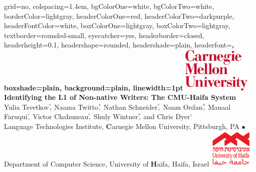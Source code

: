 \documentclass[landscape,final]{baposter}
\begin{document}
\begin{poster}{
  grid=no,
  colspacing=1.4em,
  bgColorOne=white, %
  bgColorTwo=white, %
  borderColor=lightgray, %
  headerColorOne=red, %
  headerColorTwo=darkpurple, %
  headerFontColor=white,
  boxColorOne=lightgray, %
  boxColorTwo=lightgray, %
  textborder=rounded-small, %
  eyecatcher=yes,
  headerborder=closed,
  headerheight=0.1\textheight,
  headershape=rounded, %
  headershade=plain,
  headerfont=\large\bf\sc\textsf, %
  boxshade=plain,
  background=plain,
  linewidth=1pt
}
  {%
\includegraphics[width=9em]{img/cmu_logo}\\
} %
  {\bf %
  \textsf{Identifying the L1 of Non-native Writers: The CMU-Haifa System}
  }
  {\large %
  Yulia Tsvetkov$\overset{^\textsc{c}}{\textrm{,}}$ Naama Twitto$\overset{^\textsc{h}}{\textrm{,}}$ Nathan Schneider$\overset{^\textsc{c}}{\textrm{,}}$ Noam Ordan$\overset{^\textsc{h}}{\textrm{,}}$ 
  Manaal Faruqui$\overset{^\textsc{c}}{\textrm{,}}$ Victor Chahuneau$\overset{^\textsc{c}}{\textrm{,}}$ Shuly Wintner$\overset{^\textsc{h}}{\textrm{,}}$ and Chris Dyer$\overset{^\textsc{c}}{\textrm{}}$
  \\
  Language Technologies Institute,
  \textbf{C}arnegie Mellon University, Pittsburgh, PA
  $\bullet$ Department of Computer Science, University of \textbf{H}aifa, Haifa, Israel
  }
  {  \includegraphics[height=5.1em]{img/haifa_univ_logo} %
  }


\end{poster}
\end{document}
